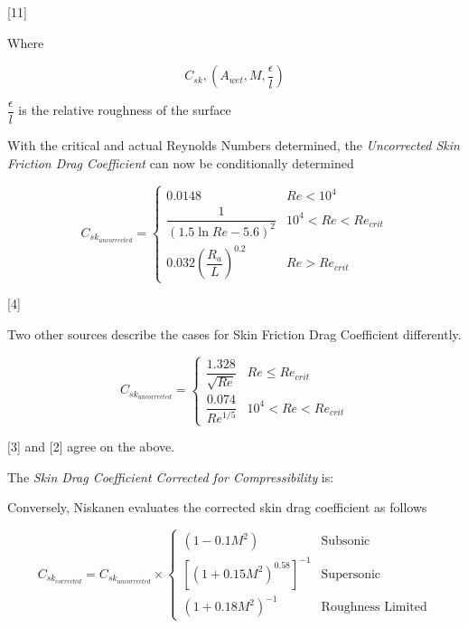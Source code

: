 \documentclass[]{book}
\begin{document}
{[}11{]}

Where

\begin{equation}
\label{friction_drag_coefficient}
C_{sk}, (A_{wet}, M, \dfrac{\epsilon}{l} )
\end{equation}

\(\dfrac{\epsilon}{l}\) is the relative roughness of the surface

With the critical and actual Reynolds Numbers determined, the
\emph{Uncorrected Skin Friction Drag Coefficient} can now be
conditionally determined

\begin{equation}
\label{eq_skin_drag_coefficient_uncorrected}
C_{sk_{uncorrected}} = 
\begin{cases}
    0.0148                                    & Re < 10^4 \\
    \dfrac{1}{(1.5 \ln Re - 5.6)^2}            & 10^4 < Re < Re_{crit} \\
    0.032 \left( \dfrac{R_a}{L} \right)^{0.2} & Re > Re_{crit}
\end{cases}
\end{equation}

{[}4{]}

Two other sources describe the cases for Skin Friction Drag Coefficient
differently.

\begin{equation}
C_{sk_{uncorrected}} = 
\begin{cases}
    \dfrac{1.328}{\sqrt{Re}} & Re \le Re_{crit} \\
    \dfrac{0.074}{Re^{1/5}}  & 10^4 < Re < Re_{crit}
\end{cases}
\end{equation}

{[}3{]} and {[}2{]} agree on the above.

The \emph{Skin Drag Coefficient Corrected for Compressibility} is:

Conversely, Niskanen evaluates the corrected skin drag coefficient as
follows

\begin{equation}
\label{eq_skin_drag_coefficient_corrected}
C_{sk_{corrected}} = C_{sk_{uncorrected}} \times 
\begin{cases}
     ( 1- 0.1 M^2 )                          & \text{Subsonic} \\
     \left[ (1+0.15 M^2)^{0.58} \right]^{-1} & \text{Supersonic} \\
     ( 1 + 0.18 M^2 )^{-1}                   & \text{Roughness Limited}
\end{cases}
\end{equation}
\end{document}
